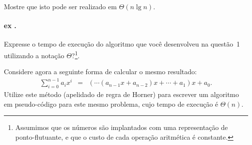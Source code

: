 \documentclass[a4wide]{article}
\newcounter{ExCounter}
\newcommand{\exercicio}[0]{%
\stepcounter{ExCounter}
\paragraph{ex \theExCounter.}
}
\begin{document}
Mostre que isto pode ser realizado em $\Theta(n \lg n)$.

\exercicio

Expresse o tempo de execução do algoritmo que você desenvolveu na
questão~1 utilizando a notação
$\Theta$?\footnote{Assumimos que os números são implantados com uma
  representação de ponto-flutuante, e que o custo de cada operação
  aritmética é constante.}.

Considere agora a seguinte forma de calcular o mesmo resultado:
\begin{eqnarray*}
\sum_{i=0}^{n-1} a_i x^i & = & (\cdots(a_{n-1}x + a_{n-2})x + \cdots + a_1)x + a_0.
\end{eqnarray*}
Utilize este método (apelidado de regra de Horner) para escrever um
algoritmo em pseudo-código para este mesmo problema, cujo tempo de
execução é $\Theta(n)$.
\end{document}
